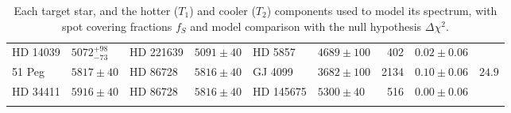 \begin{tiny}
\begin{longtable}{ll|ll|ll|rcc}
HD 14039 & $5072^{+98}_{-73}$ & HD 221639 & $5091 \pm 40$ & HD 5857 & $4689 \pm 100$ & 402 & $0.02 \pm 0.06$ &  \\
51 Peg & $5817 \pm 40$ & HD 86728 & $5816 \pm 40$ & GJ 4099 & $3682 \pm 100$ & 2134 & $0.10 \pm 0.06$ & $24.9$ \\
HD 34411 & $5916 \pm 40$ & HD 86728 & $5816 \pm 40$ & HD 145675 & $5300 \pm 40$ & 516 & $0.00 \pm 0.06$ &  \\
\caption{Each target star, and the hotter ($T_1$) and cooler ($T_2$) components used to model its spectrum, with spot covering fractions $f_S$ and model comparison with the null hypothesis $\Delta \chi^2$. 
\label{tab:comptable}}
\end{longtable}
\end{tiny}

